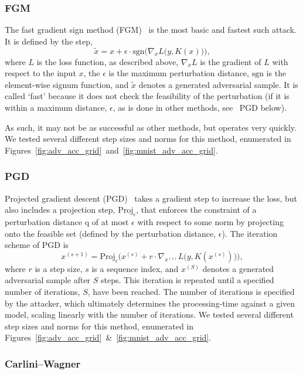 \subsubsection{FGM}

The fast gradient sign method (FGM)~\cite{fgm} is the most basic and fastest such attack.
It is defined by the step,
$$
   \widetilde{x} = x + \epsilon \cdot \textrm{sgn}\Big(\nabla_{x} L\big(y, K(x)\big)\Big),
$$
where $L$ is the loss function, as described above, $\nabla_{x} L$ is the gradient of $L$ with respect to the input $x$, the $\epsilon$ is the maximum perturbation distance, $\textrm{sgn}$ is the element-wise signum function, and $\widetilde{x}$ denotes a generated adversarial sample.
It is called `fast' because it does not check the feasibility of the perturbation (if it is within a maximum distance, $\epsilon$, as is done in other methods, see \eg~PGD below).

As such, it may not be as successful as other methods, but operates very quickly.
We tested several different step sizes and norms for this method, enumerated in Figures~\ref{fig:adv_acc_grid}~and~\ref{fig:mnist_adv_acc_grid}.

\subsubsection{PGD}

Projected gradient descent (PGD)~\cite{carlini_towards_2017} takes a gradient step to increase the loss, but also includes a projection step, $\mathrm{Proj}_\epsilon$, that enforces the constraint of a perturbation distance q of at most $\epsilon$ with respect to some norm by projecting onto the feasible set (defined by the perturbation distance, $\epsilon$).
The iteration scheme of PGD is
$$
    x^{(s+1)} = \mathrm{Proj}_\epsilon \Big( x^{(s)} + r \cdot \nabla_{x^{(s)}} L\big(y, K(x^{(s)})\big) \Big),
$$
where $r$ is a step size, $s$ is a sequence index, and $x^{(S)}$ denotes a generated adversarial sample after $S$ steps.
This iteration is repeated until a specified number of iterations, $S$, have been reached.
The number of iterations is specified by the attacker, which ultimately determines the processing-time against a given model, scaling linearly with the number of iterations.
We tested several different step sizes and norms for this method, enumerated in Figures~\ref{fig:adv_acc_grid}~\&~\ref{fig:mnist_adv_acc_grid}.

\subsubsection{Carlini--Wagner}

